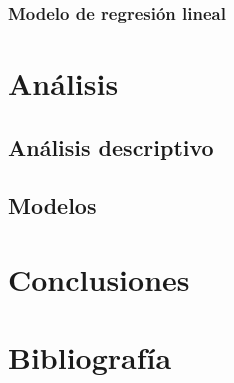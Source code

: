 \documentclass[12pt,twoside]{templates/facsothesis}
\begin{document}
\hypertarget{modelo-de-regresiuxf3n-lineal}{%
\subsection{Modelo de regresión lineal}\label{modelo-de-regresiuxf3n-lineal}}

\hypertarget{anuxe1lisis}{%
\chapter{Análisis}\label{anuxe1lisis}}

\hypertarget{anuxe1lisis-descriptivo}{%
\section{Análisis descriptivo}\label{anuxe1lisis-descriptivo}}

\hypertarget{modelos}{%
\section{Modelos}\label{modelos}}

\hypertarget{conclusiones}{%
\chapter{Conclusiones}\label{conclusiones}}

\hypertarget{bibliografuxeda}{%
\chapter{Bibliografía}\label{bibliografuxeda}}



\end{document}
